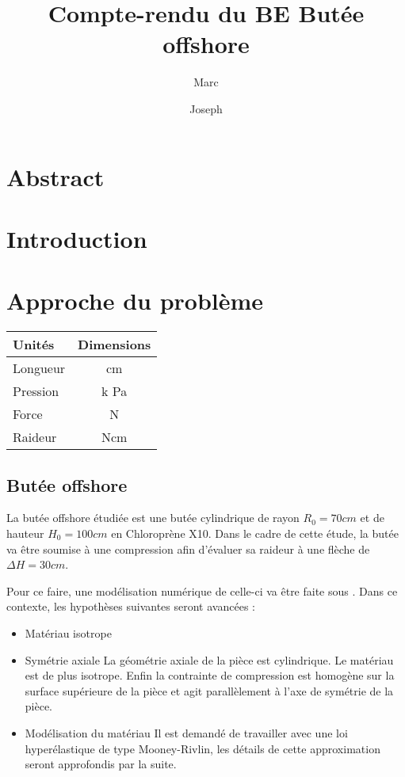 ﻿ \documentclass{article}
\title{Compte-rendu du BE Butée offshore}
\author{\bsc{Muller} Marc \and \bsc{Buquet} Joseph}
\newcommand{\abaqus}{\bsc{Abaqus}\xspace}
\begin{document}
\maketitle

\newpage

\section{Abstract}

\section{Introduction}




\section{Approche du problème}

\begin{tabular}{|l|c|}
\hline
Unités & Dimensions \\ \hline
Longueur & cm \\
Pression & k Pa \\
Force & N \\
Raideur & N\/cm \\ \hline
\end{tabular}

\subsection{Butée offshore}
La butée offshore étudiée est une butée cylindrique de rayon $R_0 = 70 cm$ et de hauteur $H_0 = 100 cm$ en Chloroprène X10. Dans le cadre de cette étude, la butée va être soumise à une compression afin d'évaluer sa raideur à une flèche de $\Delta H = 30 cm$.

Pour ce faire, une modélisation numérique de celle-ci va être faite sous \abaqus. Dans ce contexte, les hypothèses suivantes seront avancées :
\begin{itemize}
\item Matériau isotrope
\item Symétrie axiale
La géométrie axiale de la pièce est cylindrique. Le matériau est de plus isotrope. Enfin la contrainte de compression est homogène sur la surface supérieure de la pièce et agit parallèlement à l'axe de symétrie de la pièce.
\item Modélisation du matériau
Il est demandé de travailler avec une loi hyperélastique de type Mooney-Rivlin, les détails de cette approximation seront approfondis par la suite.
\end{itemize}
\end{document}
